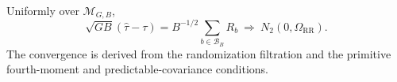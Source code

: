 Uniformly over \(\mathcal M_{G,B}\),
\[
\sqrt{GB}(\widehat\tau-\tau)=B^{-1/2}\sum_{b\in\mathcal B_B}R_b\ \Rightarrow\ N_2(0,\Omega_{\mathrm{RR}}).
\]
The convergence is derived from the randomization filtration and the primitive fourth-moment and predictable-covariance conditions.